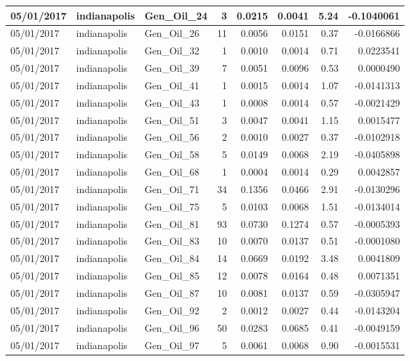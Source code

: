 \documentclass[
  letterpaper,
  DIV=11,
  numbers=noendperiod]{scrartcl}
\begin{document}
\begin{tabular}{l|l|l|r|r|r|r|r}
\hline
05/01/2017 & indianapolis & Gen\_Oil\_24 & 3 & 0.0215 & 0.0041 & 5.24 & -0.1040061\\
\hline
05/01/2017 & indianapolis & Gen\_Oil\_26 & 11 & 0.0056 & 0.0151 & 0.37 & -0.0166866\\
\hline
05/01/2017 & indianapolis & Gen\_Oil\_32 & 1 & 0.0010 & 0.0014 & 0.71 & 0.0223541\\
\hline
05/01/2017 & indianapolis & Gen\_Oil\_39 & 7 & 0.0051 & 0.0096 & 0.53 & 0.0000490\\
\hline
05/01/2017 & indianapolis & Gen\_Oil\_41 & 1 & 0.0015 & 0.0014 & 1.07 & -0.0141313\\
\hline
05/01/2017 & indianapolis & Gen\_Oil\_43 & 1 & 0.0008 & 0.0014 & 0.57 & -0.0021429\\
\hline
05/01/2017 & indianapolis & Gen\_Oil\_51 & 3 & 0.0047 & 0.0041 & 1.15 & 0.0015477\\
\hline
05/01/2017 & indianapolis & Gen\_Oil\_56 & 2 & 0.0010 & 0.0027 & 0.37 & -0.0102918\\
\hline
05/01/2017 & indianapolis & Gen\_Oil\_58 & 5 & 0.0149 & 0.0068 & 2.19 & -0.0405898\\
\hline
05/01/2017 & indianapolis & Gen\_Oil\_68 & 1 & 0.0004 & 0.0014 & 0.29 & 0.0042857\\
\hline
05/01/2017 & indianapolis & Gen\_Oil\_71 & 34 & 0.1356 & 0.0466 & 2.91 & -0.0130296\\
\hline
05/01/2017 & indianapolis & Gen\_Oil\_75 & 5 & 0.0103 & 0.0068 & 1.51 & -0.0134014\\
\hline
05/01/2017 & indianapolis & Gen\_Oil\_81 & 93 & 0.0730 & 0.1274 & 0.57 & -0.0005393\\
\hline
05/01/2017 & indianapolis & Gen\_Oil\_83 & 10 & 0.0070 & 0.0137 & 0.51 & -0.0001080\\
\hline
05/01/2017 & indianapolis & Gen\_Oil\_84 & 14 & 0.0669 & 0.0192 & 3.48 & 0.0041809\\
\hline
05/01/2017 & indianapolis & Gen\_Oil\_85 & 12 & 0.0078 & 0.0164 & 0.48 & 0.0071351\\
\hline
05/01/2017 & indianapolis & Gen\_Oil\_87 & 10 & 0.0081 & 0.0137 & 0.59 & -0.0305947\\
\hline
05/01/2017 & indianapolis & Gen\_Oil\_92 & 2 & 0.0012 & 0.0027 & 0.44 & -0.0143204\\
\hline
05/01/2017 & indianapolis & Gen\_Oil\_96 & 50 & 0.0283 & 0.0685 & 0.41 & -0.0049159\\
\hline
05/01/2017 & indianapolis & Gen\_Oil\_97 & 5 & 0.0061 & 0.0068 & 0.90 & -0.0015531\\

\end{tabular}
\end{document}
